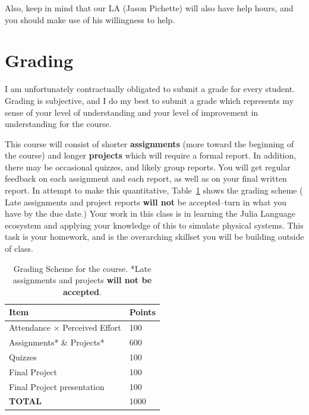 \documentclass[justified]{tufte-handout}
\begin{document}
Also, keep in mind that our LA (Jason Pichette)  will also have help hours, and you should make use of his willingness to help. 

\section{Grading}
I am unfortunately contractually obligated to submit a grade for every student. Grading is subjective, and I do my best to submit a grade which represents my sense of your level of understanding and your level of improvement in understanding for the course. 

This course will consist of shorter \textbf{assignments} (more toward the beginning of the course) and longer \textbf{projects} which will require a formal report. In addition, there may be occasional quizzes, and likely group reports. You will get regular feedback on each assignment and each report, as well as on your final written report. In attempt to make this quantitative, Table~\ref{tab:normaltab} shows the grading scheme ( Late assignments and project reports {\bfseries will not} be accepted--turn in what you have by the due date.) Your work in this class is in learning the Julia Language ecosystem and applying your knowledge of this to simulate physical systems. This task is your homework, and is the overarching skillset you will be building outside of class.  \\
\begin{table}[h]
  \centering
  \selectfont
  \begin{tabular}{ll}
    \toprule
    Item &  Points\\
    \midrule
    Attendance $\times$ Perceived Effort & 100 \\
    Assignments* \& Projects* &  600 \\
    Quizzes & 100\\
    Final Project & 100\\
    Final Project presentation & 100\\
    {\bf TOTAL} & 1000 \\
    \bottomrule
  \end{tabular}
  \caption{Grading Scheme for the course. *Late assignments and projects {\bf will not be accepted}.}
  \label{tab:normaltab}
\end{table}
\end{document}
